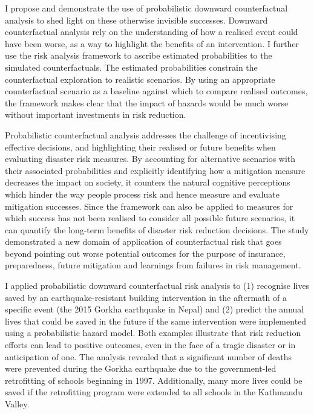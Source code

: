 I propose and demonstrate the use of probabilistic downward counterfactual analysis to shed light on these otherwise invisible successes. Downward counterfactual analysis rely on the understanding of how a realised event could have been worse, as a way to highlight the benefits of an intervention. I further use the risk analysis framework to ascribe estimated probabilities to the simulated counterfactuals. The estimated probabilities constrain the counterfactual exploration to realistic scenarios. By using an appropriate counterfactual scenario as a baseline against which to compare realised outcomes, the framework makes clear that the impact of hazards would be much worse without important investments in risk reduction.

Probabilistic counterfactual analysis addresses the challenge of incentivising effective decisions, and highlighting their realised or future benefits when evaluating disaster risk measures. By accounting for alternative scenarios with their associated probabilities and explicitly identifying how a mitigation measure decreases the impact on society, it counters the natural cognitive perceptions which hinder the way people process risk and hence measure and evaluate mitigation successes. Since the framework can also be applied to measures for which success has not been realised to consider all possible future scenarios, it can quantify the long-term benefits of disaster risk reduction decisions. The study demonstrated a new domain of application of counterfactual risk that goes beyond pointing out worse potential outcomes for the purpose of insurance, preparedness, future mitigation and learnings from failures in risk management.

I applied probabilistic downward counterfactual risk analysis to (1) recognise lives saved by an earthquake-resistant building intervention in the aftermath of a specific event (the 2015 Gorkha earthquake in Nepal) and (2) predict the annual lives that could be saved in the future if the same intervention were implemented using a probabilistic hazard model. Both examples illustrate that risk reduction efforts can lead to positive outcomes, even in the face of a tragic disaster or in anticipation of one. The analysis revealed that a significant number of deaths were prevented during the Gorkha earthquake due to the government-led retrofitting of schools beginning in 1997. Additionally, many more lives could be saved if the retrofitting program were extended to all schools in the Kathmandu Valley.

